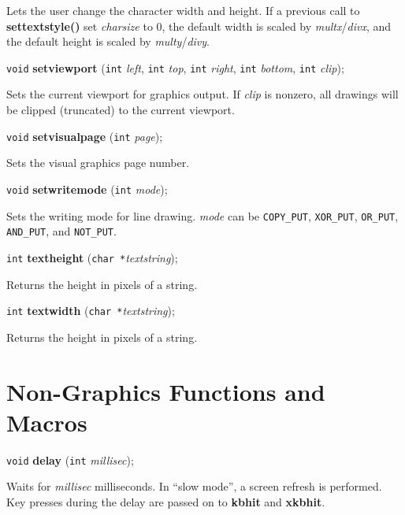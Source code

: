 \documentclass[a4paper,11pt]{article}
\newcommand{\V}{\texttt{void}}      %
\newcommand{\I}{\texttt{int}}       %
\newcommand{\C}{\texttt{char *}}    %
\newcommand{\func}[1]{\textbf{#1}}  %
\newcommand{\A}[1]{\emph{#1}}       %
\newcommand{\T}[1]{\texttt{#1}}     %
\newenvironment{bgi}
{ %
  \begin{snugshade}
}
{ %
  \end{snugshade}
}
\begin{document}
Lets the user change the character width and height. If a previous
call to \func{settextstyle()} set \A{charsize} to 0, the default width
is scaled by \A{multx}/\A{divx}, and the default height is scaled by
\A{multy}/\A{divy}.


\begin{bgi}
\V{} \func{setviewport} (\I{} \A{left}, \I{} \A{top}, \I{} \A{right},
\I{} \A{bottom}, \I{} \A{clip});
\end{bgi}

Sets the current viewport for graphics output. If \A{clip} is nonzero,
all drawings will be clipped (truncated) to the current viewport.


\begin{bgi}
\V{} \func{setvisualpage} (\I{} \A{page});
\end{bgi}

Sets the visual graphics page number.


\begin{bgi}
\V{} \func{setwritemode} (\I{} \A{mode});
\end{bgi}

Sets the writing mode for line drawing. \A{mode} can be \T{COPY\_PUT},
\T{XOR\-\_PUT}, \T{OR\_PUT}, \T{AND\_PUT}, and \T{NOT\_PUT}.


\begin{bgi}
\I{} \func{textheight} (\C{}\A{textstring});
\end{bgi}

Returns the height in pixels of a string.


\begin{bgi}
\I{} \func{textwidth} (\C{}\A{textstring});
\end{bgi}

Returns the height in pixels of a string.


\section{Non-Graphics Functions and Macros}

\begin{bgi}
\V{} \func{delay} (\I{} \A{millisec});
\end{bgi}

Waits for \A{millisec} milliseconds. In ``slow mode'', a screen
refresh is performed. Key presses during the delay are passed on to
\func{kbhit} and \func{xkbhit}.
\end{document}
